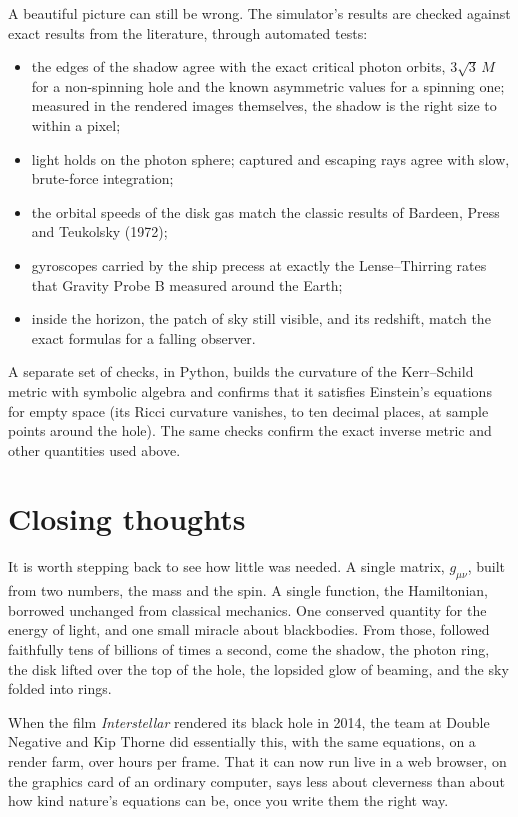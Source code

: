 \documentclass[11pt,a4paper]{article}
\begin{document}
A beautiful picture can still be wrong. The simulator's results are checked against exact
results from the literature, through automated tests:
\begin{itemize}
  \item the edges of the shadow agree with the exact critical photon orbits, $3\sqrt3\,M$
        for a non-spinning hole and the known asymmetric values for a spinning one;
        measured in the rendered images themselves, the shadow is the right size to within
        a pixel;
  \item light holds on the photon sphere; captured and escaping rays agree with slow,
        brute-force integration;
  \item the orbital speeds of the disk gas match the classic results of Bardeen, Press and
        Teukolsky (1972);
  \item gyroscopes carried by the ship precess at exactly the Lense--Thirring rates that
        Gravity Probe B measured around the Earth;
  \item inside the horizon, the patch of sky still visible, and its redshift, match the
        exact formulas for a falling observer.
\end{itemize}
A separate set of checks, in Python, builds the curvature of the Kerr--Schild metric with
symbolic algebra and confirms that it satisfies Einstein's equations for empty space (its
Ricci curvature vanishes, to ten decimal places, at sample points around the hole). The
same checks confirm the exact inverse metric and other quantities used above.

\section{Closing thoughts}

It is worth stepping back to see how little was needed. A single matrix, $g_{\mu\nu}$, built
from two numbers, the mass and the spin. A single function, the Hamiltonian, borrowed
unchanged from classical mechanics. One conserved quantity for the energy of light, and one
small miracle about blackbodies. From those, followed faithfully tens of billions of times
a second, come the shadow, the photon ring, the disk lifted over the top of the hole, the
lopsided glow of beaming, and the sky folded into rings.

When the film \emph{Interstellar} rendered its black hole in 2014, the team at Double
Negative and Kip Thorne did essentially this, with the same equations, on a render farm,
over hours per frame. That it can now run live in a web browser, on the graphics card of
an ordinary computer, says less about cleverness than about how kind nature's equations
can be, once you write them the right way.
\end{document}
